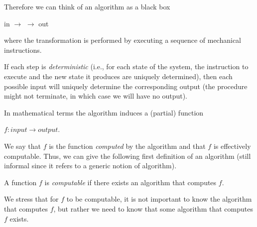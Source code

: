 Therefore we can think of an algorithm as a black box
\begin{center}
  in $\rightarrow$  $\rightarrow$ out
\end{center}
where the transformation is performed by executing a sequence of
mechanical instructions.

If each step is \emph{deterministic} (i.e., for each state of the
system, the instruction to execute and the new state it produces are
uniquely determined), then each possible input will uniquely determine
the corresponding output (the procedure might not terminate, in which case we will have no output).

In mathematical terms the algorithm induces a (partial) function

\begin{center}
  $f : \mathit{input} \rightarrow \mathit{output}$.
\end{center}

We say that $f$ is the function \emph{computed} by the algorithm and
that $f$ is effectively computable. Thus, we can give the following
first definition of an algorithm (still informal since it refers to a
generic notion of algorithm).

\begin{definition}
  A function $f$ is \emph{computable} if there exists an algorithm
  that computes $f$.
\end{definition}

We stress that for $f$ to be computable, it is not important to know the algorithm that computes $f$, but rather we need to know that some algorithm that computes $f$ exists.

